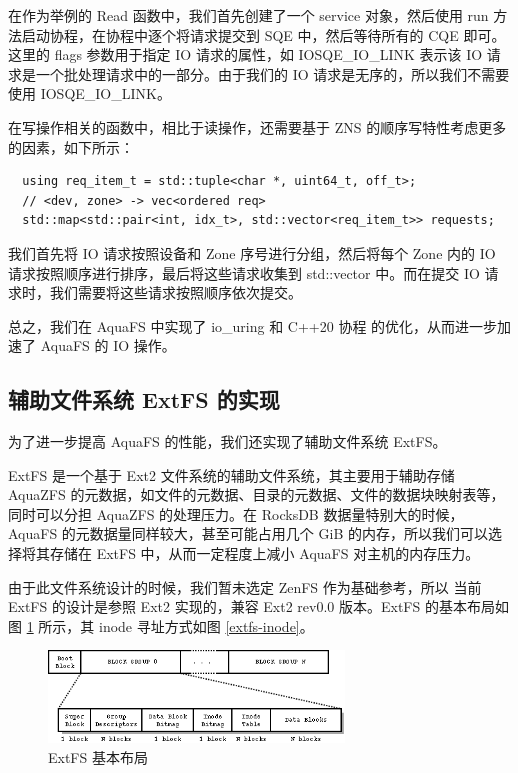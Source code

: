 在作为举例的 Read 函数中，我们首先创建了一个 service 对象，然后使用 run 方法启动协程，在协程中逐个将请求提交到 SQE 中，然后等待所有的 CQE 即可。这里的 flags 参数用于指定 IO 请求的属性，如 IOSQE\_IO\_LINK 表示该 IO 请求是一个批处理请求中的一部分。由于我们的 IO 请求是无序的，所以我们不需要使用 IOSQE\_IO\_LINK。

在写操作相关的函数中，相比于读操作，还需要基于 ZNS 的顺序写特性考虑更多的因素，如下所示：

\begin{lstlisting}
  using req_item_t = std::tuple<char *, uint64_t, off_t>;
  // <dev, zone> -> vec<ordered req>
  std::map<std::pair<int, idx_t>, std::vector<req_item_t>> requests;
\end{lstlisting}

我们首先将 IO 请求按照设备和 Zone 序号进行分组，然后将每个 Zone 内的 IO 请求按照顺序进行排序，最后将这些请求收集到 std::vector 中。而在提交 IO 请求时，我们需要将这些请求按照顺序依次提交。

总之，我们在 AquaFS 中实现了 io\_uring 和 C++20 协程 的优化，从而进一步加速了 AquaFS 的 IO 操作。

\subsection{辅助文件系统 ExtFS 的实现}

为了进一步提高 AquaFS 的性能，我们还实现了辅助文件系统 ExtFS。

ExtFS 是一个基于 Ext2 文件系统的辅助文件系统，其主要用于辅助存储 AquaZFS 的元数据，如文件的元数据、目录的元数据、文件的数据块映射表等，同时可以分担 AquaZFS 的处理压力。在 RocksDB 数据量特别大的时候，AquaFS 的元数据量同样较大，甚至可能占用几个 GiB 的内存，所以我们可以选择将其存储在 ExtFS 中，从而一定程度上减小 AquaFS 对主机的内存压力。

由于此文件系统设计的时候，我们暂未选定 ZenFS 作为基础参考，所以 当前 ExtFS 的设计是参照 Ext2 实现的，兼容 Ext2 rev0.0 版本。ExtFS 的基本布局如图 \ref{extfs-layout} 所示，其 inode 寻址方式如图 \ref{extfs-inode}。

\begin{figure}[htbp]
  \centering
  \includegraphics[width=0.7\textwidth]{fig/extfs-layout}
  \caption{ExtFS 基本布局}
  \label{extfs-layout}
\end{figure}

